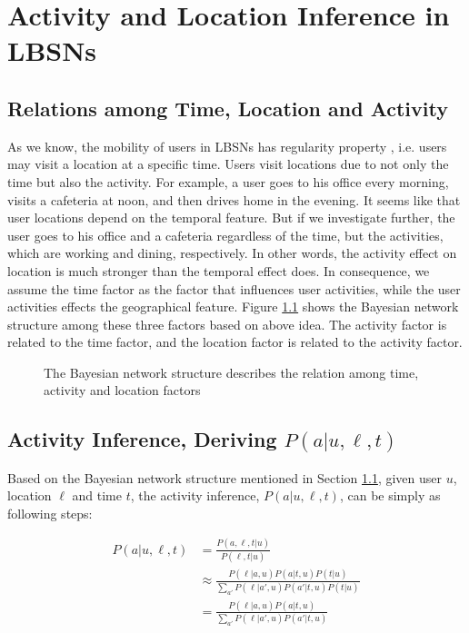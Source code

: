 \chapter{Activity and Location Inference in LBSNs}
\label{sec:4}

\section{Relations among Time, Location and Activity}
\label{sec:4-1}

As we know, the mobility of users in LBSNs has regularity property \cite{11_KDD_Cho}, i.e. users may visit a location at a specific time. Users visit locations due to not only the time but also the activity. For example, a user goes to his office every morning, visits a cafeteria at noon, and then drives home in the evening. It seems like that user locations depend on the temporal feature. But if we investigate further, the user goes to his office and a cafeteria regardless of the time, but the activities, which are working and dining, respectively. In other words, the activity effect on location is much stronger than the temporal effect does. In consequence, we assume the time factor as the factor that influences user activities, while the user activities effects the geographical feature. Figure \ref{fig:network} shows the Bayesian network structure among these three factors based on above idea. The activity factor is related to the time factor, and the location factor is related to the activity factor.


\begin{figure}[t]
\centering
{}
\caption{The Bayesian network structure describes the relation among time, activity and location factors}
\label{fig:network}
\end{figure}

\section{Activity Inference, Deriving $P(a | u, \ell , t )$}
\label{sec:4-2}

Based on the Bayesian network structure mentioned in Section \ref{sec:4-1}, given user $u$, location $\ell$ and time $t$, the activity inference, $P(a | u, \ell , t )$, can be simply as following steps:

\begin{align}
\label{equ:activity_inference}
P(a | u, \ell , t ) & = \frac{P(a, \ell, t | u)}{P( \ell , t | u)} \nonumber \\
& \approx \frac{P(\ell | a, u) P(a | t, u) P (t | u)}{\sum_{a'}P(\ell | a',u)P(a'|t,u)P(t|u)} \nonumber \\
& = \frac{P(\ell | a, u) P(a | t, u)}{\sum_{a'}P(\ell | a', u)P(a'|t, u)}
\end{align}

